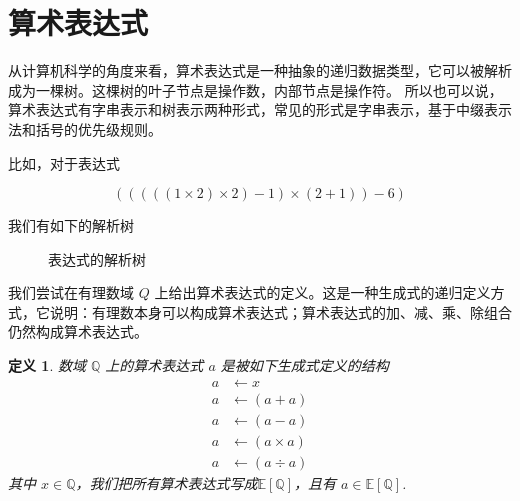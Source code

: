 \documentclass[a4paper,12pt]{book}
\numberwithin{problem}{section}
\newtheorem{definition}{定义}
\numberwithin{definition}{section}
\numberwithin{lemma}{section}
\numberwithin{proposition}{section}
\numberwithin{theorem}{section}
\numberwithin{grammar}{section}
\numberwithin{program}{section}
\numberwithin{convention}{section}
\numberwithin{corollary}{section}
\begin{document}
\section{算术表达式}

从计算机科学的角度来看，算术表达式是一种抽象的递归数据类型，它可以被解析成为一棵树。这棵树的叶子节点是操作数，内部节点是操作符。
所以也可以说，算术表达式有字串表示和树表示两种形式，常见的形式是字串表示，基于中缀表示法和括号的优先级规则。

比如，对于表达式

\begin{equation}
(((((1 \times 2) \times 2) - 1) \times (2 + 1)) - 6)
\end{equation}

我们有如下的解析树

\begin{figure}[ht]
\centering
{}
\caption{表达式的解析树}\label{fig:syntaxtree}
\end{figure}

我们尝试在有理数域 $Q$ 上给出算术表达式的定义。这是一种生成式的递归定义方式，它说明：有理数本身可以构成算术表达式；算术表达式的加、减、乘、除组合仍然构成算术表达式。

\begin{definition}\label{def:arithmetic-expression}
数域 $\mathbb{Q}$ 上的算术表达式 $a$ 是被如下生成式定义的结构
\begin{equation}\label{eq:productionrule}
\begin{aligned}
a &\longleftarrow x\\
a &\longleftarrow ( a + a )\\
a &\longleftarrow ( a - a )\\
a &\longleftarrow ( a \times a )\\
a &\longleftarrow ( a \div a )
\end{aligned}
\end{equation}
其中 $x \in \mathbb{Q}$，我们把所有算术表达式写成$\mathbb{E} \left [\mathbb{Q} \right ]$，且有 $a \in \mathbb{E} \left [\mathbb{Q} \right ]$.
\end{definition}
\end{document}
